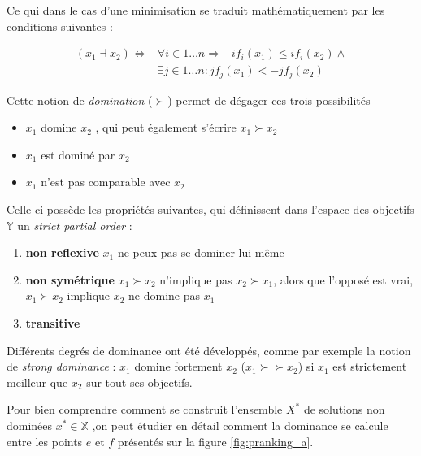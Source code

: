 Ce qui dans le cas d'une minimisation se traduit mathématiquement par les conditions suivantes : 

\begin{align*}
	(x_1 \dashv x_2) \Leftrightarrow &\forall i \in 1 \dotsc n \Rightarrow - i f_i (x_1) \leq i f_i (x_2) \land \\
	&\exists j \in 1 \dotsc n : j f_j (x_1) < - j f_j (x_2)
\end{align*}

Cette notion de \textit{domination} ($\succ$)  permet de dégager ces trois possibilités

\begin{itemize}
\item $x_1$ domine $x_2$ , qui peut également s'écrire $x_1 \succ x_2$
\item $x_1$ est dominé par $x_2$
\item $x_1$ n'est pas comparable avec $x_2$
\end{itemize}

Celle-ci possède les propriétés suivantes, qui définissent dans l'espace des objectifs $\mathbb{Y}$ un \textit{strict partial order} : 

\begin{enumerate}
\item{\textbf{non reflexive}}  $x_1$ ne peux pas se dominer lui même
\item{\textbf{non symétrique}} $ x_1 \succ x_2$ n'implique pas $x_2 \succ x_1$, alors que l'opposé est vrai, $x_1 \succ x_2$ implique $x_2$ ne domine pas $x_1$
\item{\textbf{transitive} }
\end{enumerate}

Différents degrés de dominance ont été développés, comme par exemple la notion de \textit{strong dominance} : $x_1$ domine fortement $x_2$ ($x_1 \succ \succ x_2$) si $x_1$ est strictement meilleur que $x_2$ sur tout ses objectifs. 

Pour bien comprendre comment se construit l'ensemble $X^*$ de solutions non dominées $x^* \in \mathbb{X}$ ,on peut étudier en détail comment la dominance se calcule entre les points $e$ et $f$ présentés sur la figure \ref{fig:pranking_a}.

